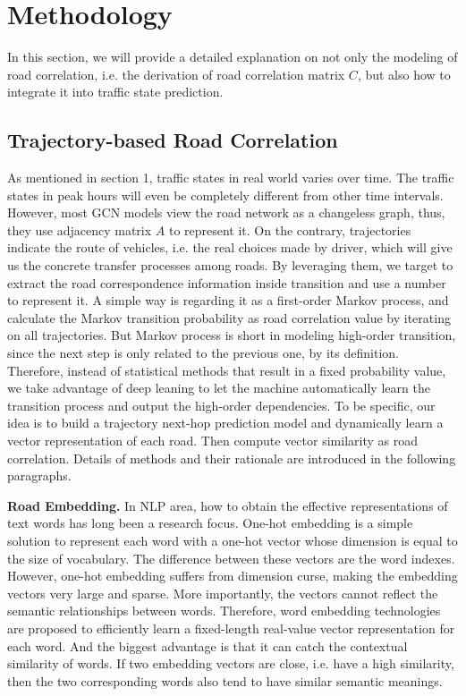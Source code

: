 
\section{Methodology}
In this section, we will provide a detailed explanation on not only the modeling of road correlation, i.e. the derivation of road correlation matrix $C$, but also how to integrate it into traffic state prediction.

\subsection{Trajectory-based Road Correlation}
As mentioned in section 1, traffic states in real world varies over time. The traffic states in peak hours will even be completely different from other time intervals. However, most GCN models view the road network as a changeless graph, thus, they use adjacency matrix $A$ to represent it. On the contrary, trajectories indicate the route of vehicles, i.e. the real choices made by driver, which will give us the concrete transfer processes among roads. By leveraging them, we target to extract the road correspondence information inside transition and use a number to represent it. A simple way is regarding it as a first-order Markov process\cite{AAAI21}, and calculate the Markov transition probability as road correlation value by iterating on all trajectories. But Markov process is short in modeling high-order transition, since the next step is only related to the previous one, by its definition. Therefore, instead of statistical methods that result in a fixed probability value, we take advantage of deep leaning to let the machine automatically learn the transition process and output the high-order dependencies. To be specific, our idea is to build a trajectory next-hop prediction model and dynamically learn a vector representation of each road. Then compute vector similarity as road correlation. Details of methods and their rationale are introduced in the following paragraphs.

\vspace{\baselineskip}

\textbf{Road Embedding.} In NLP area, how to obtain the effective representations of text words has long been a research focus. One-hot embedding is a simple solution to represent each word with a one-hot vector whose dimension is equal to the size of vocabulary. The difference between these vectors are the word indexes. However, one-hot embedding suffers from dimension curse, making the embedding vectors very large and sparse. More importantly, the vectors cannot reflect the semantic relationships between words. Therefore, word embedding technologies\cite{word_embed} are proposed to efficiently learn a fixed-length real-value vector representation for each word. And the biggest advantage is that it can catch the contextual similarity of words. If two embedding vectors are close, i.e. have a high similarity, then the two corresponding words also tend to have similar semantic meanings.

